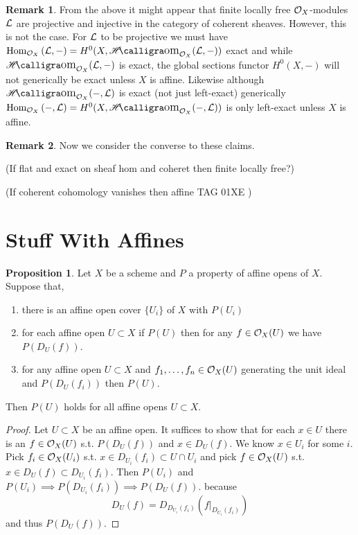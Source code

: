 \documentclass[12pt]{extarticle}
\DeclareMathOperator{\calHom}{\mathscr{H}\text{\kern -3pt {\calligra\large om}}}
\newcommand{\shHom}[3]{\calHom_{#1} \! \left( #2, #3 \right)}
\newcommand{\Hom}[3]{\mathrm{Hom}_{#1}\left( #2, #3 \right)}
\theoremstyle{definition}
\newtheorem{proposition}[theorem]{Proposition}
\newtheorem{remark}{Remark}
\begin{document}
\begin{remark}
From the above it might appear that finite locally free $\mathcal{O}_{X}$-modules $\mathcal{L}$ are projective and injective in the category of coherent sheaves. However, this is not the case. For $\mathcal{L}$ to be projective we must have $\Hom{\struct{X}}{\L}{-} = H^0(X, \shHom{\struct{X}}{\L}{-})$ exact and while $\shHom{\struct{X}}{\L}{-}$ is exact, the global sections functor $H^0(X, -)$ will not generically be exact unless $X$ is affine. Likewise although $\shHom{\struct{X}}{-}{\L}$ is exact (not just left-exact) generically $\Hom{\struct{X}}{-}{\L} = H^0(X, \shHom{\struct{X}}{-}{\L})$ is only left-exact unless $X$ is affine.
\end{remark}

\begin{remark}
Now we consider the converse to these claims.
\end{remark}

(If flat and exact on sheaf hom and coheret then finite locally free?)

(If coherent cohomology vanishes then affine TAG 01XE )

\section{Stuff With Affines}

\begin{proposition}
Let $X$ be a scheme and $P$ a property of affine opens of $X$. Suppose that,
\begin{enumerate}
\item there is an affine open cover $\{ U_i \}$ of $X$ with $P(U_i)$
\item for each affine open $U \subset X$ if $P(U)$ then for any $f \in \mathcal{O}_{X}(U)$ we have $P(D_U(f))$.
\item for any affine open $U \subset X$ and $f_1, \dots, f_n \in \mathcal{O}_{X}(U)$ generating the unit ideal and $P(D_U(f_i))$ then $P(U)$.
\end{enumerate}
Then $P(U)$ holds for all affine opens $U \subset X$.
\end{proposition}

\begin{proof}
Let $U \subset X$ be an affine open. It suffices to show that for each $x \in U$ there is an $f \in \mathcal{O}_{X}(U)$ s.t. $P(D_U(f))$ and $x \in D_U(f)$. We know $x \in U_i$ for some $i$. Pick $f_i \in \mathcal{O}_{X}(U_i)$ s.t. $x \in D_{U_i}(f_i) \subset U \cap U_i$ and pick $f \in \mathcal{O}_{X}(U)$ s.t. $x \in D_U(f) \subset D_{U_i}(f_i)$. Then $P(U_i)$ and $P(U_i) \implies P(D_{U_i}(f_i)) \implies P(D_U(f))$. because
\[ D_U(f) = D_{D_{U_i}(f_i)}(f|_{D_{U_i}(f_i)}) \]
and thus $P(D_U(f))$. 
\end{proof}
\end{document}
